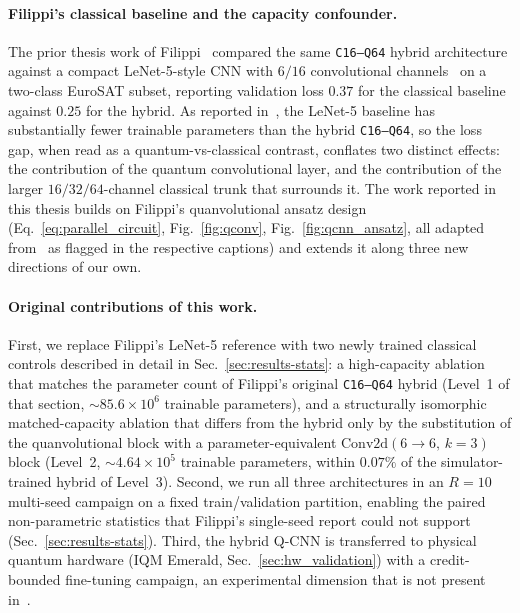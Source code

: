 \paragraph{Filippi's classical baseline and the capacity confounder.}
The prior thesis work of Filippi~\cite{Filippi2025Thesis} compared the same \texttt{C16--Q64} hybrid architecture against a compact LeNet-5-style CNN with $6/16$ convolutional channels~\cite{LeCun1998} on a two-class EuroSAT subset, reporting validation loss $0.37$ for the classical baseline against $0.25$ for the hybrid. As reported in~\cite{Filippi2025Thesis}, the LeNet-5 baseline has substantially fewer trainable parameters than the hybrid \texttt{C16--Q64}, so the loss gap, when read as a quantum-vs-classical contrast, conflates two distinct effects: the contribution of the quantum convolutional layer, and the contribution of the larger $16/32/64$-channel classical trunk that surrounds it. The work reported in this thesis builds on Filippi's quanvolutional ansatz design (Eq.~\ref{eq:parallel_circuit}, Fig.~\ref{fig:qconv}, Fig.~\ref{fig:qcnn_ansatz}, all adapted from~\cite{Filippi2025Thesis} as flagged in the respective captions) and extends it along three new directions of our own.

\paragraph{Original contributions of this work.}
First, we replace Filippi's LeNet-5 reference with two newly trained classical controls described in detail in Sec.~\ref{sec:results-stats}: a high-capacity ablation that matches the parameter count of Filippi's original \texttt{C16--Q64} hybrid (Level~1 of that section, $\sim 85.6\times 10^{6}$ trainable parameters), and a structurally isomorphic matched-capacity ablation that differs from the hybrid only by the substitution of the quanvolutional block with a parameter-equivalent $\mathrm{Conv2d}(6{\to}6,\,k{=}3)$ block (Level~2, $\sim 4.64\times 10^{5}$ trainable parameters, within $0.07\%$ of the simulator-trained hybrid of Level~3). Second, we run all three architectures in an $R=10$ multi-seed campaign on a fixed train/validation partition, enabling the paired non-parametric statistics that Filippi's single-seed report could not support (Sec.~\ref{sec:results-stats}). Third, the hybrid Q-CNN is transferred to physical quantum hardware (IQM Emerald, Sec.~\ref{sec:hw_validation}) with a credit-bounded fine-tuning campaign, an experimental dimension that is not present in~\cite{Filippi2025Thesis}.

